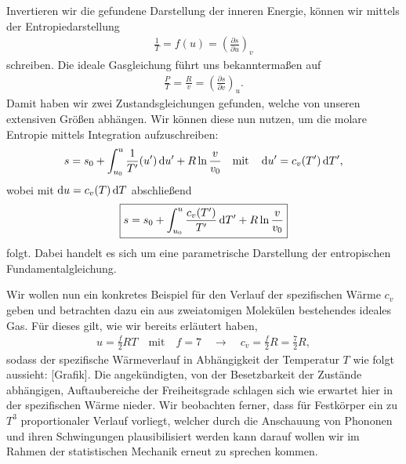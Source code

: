 Invertieren wir die gefundene Darstellung der inneren Energie, können wir mittels der Entropiedarstellung 
\begin{align*}
    \frac{1}{T}=f(u)=\left(\frac{\partial s}{\partial u}\right)_v
\end{align*} 
schreiben. Die ideale Gasgleichung führt uns bekanntermaßen auf 
\begin{align*}
    \frac{P}{T}=\frac{R}{v}=\left(\frac{\partial s}{\partial v}\right)_u.
\end{align*}
Damit haben wir zwei Zustandsgleichungen gefunden, welche von unseren extensiven Größen abhängen.
Wir können diese nun nutzen, um die molare Entropie mittels Integration aufzuschreiben: 
\begin{align*}
    s=s_0+\int_{u_0}^u\frac{1}{T'}(u')\mathop{}\!\mathrm{d} u'+R\ln\frac{v}{v_0}\quad\text{mit}\quad\mathop{}\!\mathrm{d} u'=c_v(T')\mathop{}\!\mathrm{d} T',
\end{align*}
wobei mit $\mathop{}\!\mathrm{d} u=c_v(T)\mathop{}\!\mathrm{d} T$ abschließend 
\begin{align*}
    \boxed{s=s_0+\int_{u_0}^u\frac{c_v(T')}{T'}\mathop{}\!\mathrm{d} T'+R\ln\frac{v}{v_0}}
\end{align*}
folgt.
Dabei handelt es sich um eine parametrische Darstellung der entropischen Fundamentalgleichung.

Wir wollen nun ein konkretes Beispiel für den Verlauf der spezifischen Wärme $c_v$ geben und betrachten dazu ein aus zweiatomigen Molekülen bestehendes ideales Gas. Für dieses gilt, wie wir bereits erläutert haben, 
\begin{align*}
    u=\frac{f}{2}RT\quad\text{mit}\quad f=7\quad\rightarrow\quad c_v=\frac{f}{2}R=\frac{7}{2}R,
\end{align*} 
sodass der spezifische Wärmeverlauf in Abhängigkeit der Temperatur $T$ wie folgt aussieht: [Grafik].
Die angekündigten, von der Besetzbarkeit der Zustände abhängigen, Auftaubereiche der Freiheitsgrade schlagen sich wie erwartet hier in der spezifischen Wärme nieder. 
Wir beobachten ferner, dass für Festkörper ein zu $T^3$ proportionaler Verlauf vorliegt, welcher durch die Anschauung von Phononen und ihren Schwingungen plausibilisiert werden kann \textendash{} darauf wollen wir im Rahmen der statistischen Mechanik erneut zu sprechen kommen.

